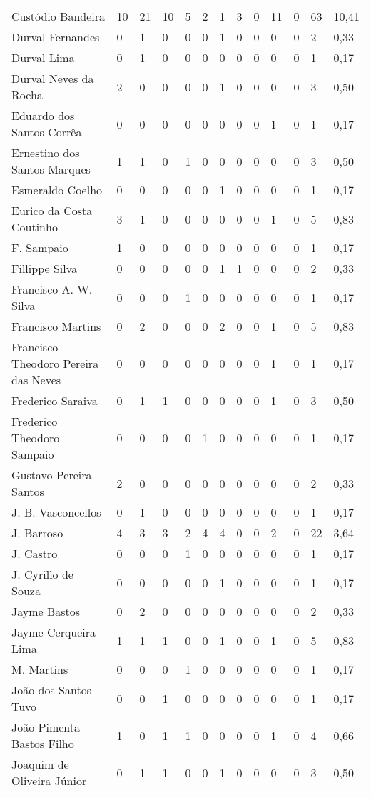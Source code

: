 \begin{table}[!htp]
{\begin{tiny}
\begin{tabular}{lllllllllllll}
Custódio Bandeira	&10	&21	&10	&5	&2	&1	&3	&0	&11	&0	&63	&10,41\\
Durval Fernandes	&0	&1	&0	&0	&0	&1	&0	&0	&0	&0	&2	&0,33\\
Durval Lima	&0	&1	&0	&0	&0	&0	&0	&0	&0	&0	&1	&0,17\\
Durval Neves da Rocha	&2	&0	&0	&0	&0	&1	&0	&0	&0	&0	&3	&0,50\\
Eduardo dos Santos Corrêa	&0	&0	&0	&0	&0	&0	&0	&0	&1	&0	&1	&0,17\\
Ernestino dos Santos Marques	&1	&1	&0	&1	&0	&0	&0	&0	&0	&0	&3	&0,50\\
Esmeraldo Coelho	&0	&0	&0	&0	&0	&1	&0	&0	&0	&0	&1	&0,17\\
Eurico da Costa Coutinho	&3	&1	&0	&0	&0	&0	&0	&0	&1	&0	&5	&0,83\\
F. Sampaio	&1	&0	&0	&0	&0	&0	&0	&0	&0	&0	&1	&0,17\\
Fillippe Silva	&0	&0	&0	&0	&0	&1	&1	&0	&0	&0	&2	&0,33\\
Francisco A. W. Silva	&0	&0	&0	&1	&0	&0	&0	&0	&0	&0	&1	&0,17\\
Francisco Martins	&0	&2	&0	&0	&0	&2	&0	&0	&1	&0	&5	&0,83\\
Francisco Theodoro Pereira das Neves	&0	&0	&0	&0	&0	&0	&0	&0	&1	&0	&1	&0,17\\
Frederico Saraiva	&0	&1	&1	&0	&0	&0	&0	&0	&1	&0	&3	&0,50\\
Frederico Theodoro Sampaio	&0	&0	&0	&0	&1	&0	&0	&0	&0	&0	&1	&0,17\\
Gustavo Pereira Santos	&2	&0	&0	&0	&0	&0	&0	&0	&0	&0	&2	&0,33\\
J. B. Vasconcellos	&0	&1	&0	&0	&0	&0	&0	&0	&0	&0	&1	&0,17\\
J. Barroso	&4	&3	&3	&2	&4	&4	&0	&0	&2	&0	&22	&3,64\\
J. Castro	&0	&0	&0	&1	&0	&0	&0	&0	&0	&0	&1	&0,17\\
J. Cyrillo de Souza	&0	&0	&0	&0	&0	&1	&0	&0	&0	&0	&1	&0,17\\
Jayme Bastos	&0	&2	&0	&0	&0	&0	&0	&0	&0	&0	&2	&0,33\\
Jayme Cerqueira Lima	&1	&1	&1	&0	&0	&1	&0	&0	&1	&0	&5	&0,83\\
M. Martins	&0	&0	&0	&1	&0	&0	&0	&0	&0	&0	&1	&0,17\\
João dos Santos Tuvo	&0	&0	&1	&0	&0	&0	&0	&0	&0	&0	&1	&0,17\\
João Pimenta Bastos Filho	&1	&0	&1	&1	&0	&0	&0	&0	&1	&0	&4	&0,66\\
Joaquim de Oliveira Júnior	&0	&1	&1	&0	&0	&1	&0	&0	&0	&0	&3	&0,50\\

\end{tabular}
\end{tiny}}
\end{table}
